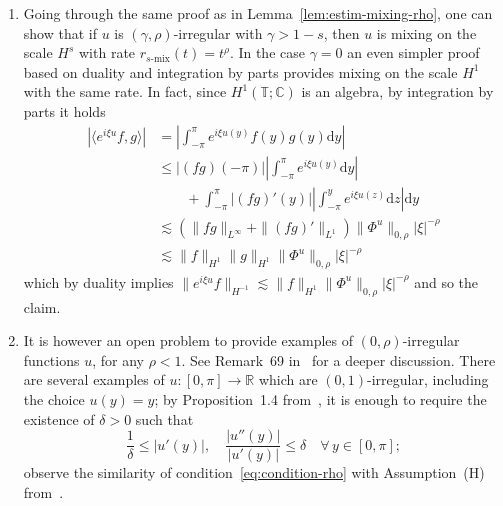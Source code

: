 \documentclass[11pt,oneside,reqno]{amsart}
\newcommand{\mathd}{\mathrm{d}}
\newenvironment{enumeratenumeric}{\begin{enumerate}[1.] }{\end{enumerate}}
\numberwithin{equation}{section}
\begin{document}
\begin{enumeratenumeric}
  \item Going through the same proof as in Lemma~\ref{lem:estim-mixing-rho},
  one can show that if $u$ is $(\gamma, \rho)$-irregular with $\gamma > 1 -
  s$, then $u$ is mixing on the scale $H^s$ with rate $r_{s
  \text{-mix}} (t) = t^{\rho}$. In the case $\gamma = 0$ an
  even simpler proof based on duality and integration by parts provides mixing
  on the scale $H^1$ with the same rate. In fact, since $H^1 (\mathbb{T};
  \mathbb{C})$ is an algebra, by integration by parts it holds
  \[ \begin{array}{ll}
       | \langle e^{i \xi u} f, g \rangle | & = \left| \int_{- \pi}^{\pi} e^{i
       \xi u (y)} f (y) g (y) \mathd y \right|\\
       & \leqslant | (f g) (- \pi) | \left| \int_{- \pi}^{\pi} e^{i \xi u
       (y)} \mathd y \right|\\
       & \qquad + \int_{- \pi}^{\pi} | (f g)' (y) | \left| \int_{- \pi}^y
       e^{i \xi u (z)} \mathd z \right| \mathd y\\
       & \lesssim (\| f g \|_{L^{\infty}} + \| (f g)' \|_{L^1})  \| \Phi^u
       \|_{0, \rho}  | \xi |^{- \rho}\\
       & \lesssim \| f \|_{H^1} \| g \|_{H^1} \| \Phi^u \|_{0, \rho}  | \xi
       |^{- \rho}
     \end{array} \]
  which by duality implies $\| e^{i \xi u} f \|_{H^{- 1}} \lesssim \| f
  \|_{H^1} \| \Phi^u \|_{0, \rho}  | \xi |^{- \rho}$ and so the claim.
  
  \item It is however an open problem to provide examples of $(0,
  \rho)$-irregular functions $u$, for any $\rho < 1$. See Remark~69
  in~{\cite{galeati2020prevalence}} for a deeper discussion. There are several
  examples of $u : [0, \pi] \rightarrow \mathbb{R}$ which are $(0,
  1)$-irregular, including the choice $u (y) = y$; by Proposition~1.4
  from~{\cite{choukgubinelli1}}, it is enough to require the existence of
  $\delta > 0$ such that
  \begin{equation}
    \frac{1}{\delta} \leqslant | u' (y) |, \quad \frac{| u'' (y) |}{| u' (y)
    |} \leqslant \delta \quad \forall \, y \in [0, \pi] ;
    \label{eq:condition-rho}
  \end{equation}
  observe the similarity of condition~\eqref{eq:condition-rho} with
  Assumption~(H) from~{\cite{zelati2020stable}}.
  

\end{enumeratenumeric}
\end{document}
